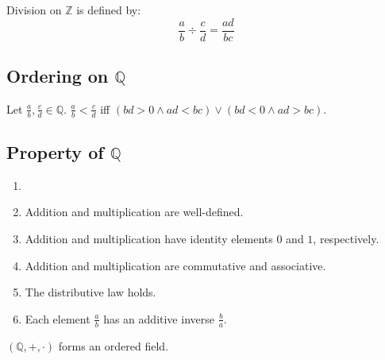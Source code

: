 \documentclass{report}
\begin{document}
			\begin{defn} \label{def_div_Q}
				Division on $\mathbb{Z}$ is defined by:
				\begin{displaymath}
					\frac{a}{b}\div\frac{c}{d}=\frac{ad}{bc}
				\end{displaymath}
			\end{defn}
		
		\subsection{Ordering on $\mathbb{Q}$}
		
			\begin{defn} \label{def_order_Q}
				Let $\frac{a}{b},\frac{c}{d} \in \mathbb{Q}$. $\frac{a}{b}<\frac{c}{d}$ iff $(bd>0 \wedge ad<bc) \vee (bd<0 \wedge ad>bc)$.
			\end{defn}
			
\begin{comment}%
			\begin{prop}
				The subset $P=\{\frac{a}{b}\in\mathbb{Q}|ab>0}$ is a positive set in $\mathbb{Q}$.
			\end{prop}
\end{comment}
		
		\subsection{Property of $\mathbb{Q}$}
		
			\begin{thm} \label{thm_property_Q}
				\begin{enumerate}
					\item[]
					\item Addition and multiplication are well-defined.
					\item Addition and multiplication have identity elements $0$ and $1$, respectively.
					\item Addition and multiplication are commutative and associative.
					\item The distributive law holds.
					\item Each element $\frac{a}{b}$ has an additive inverse $\frac{b}{a}$.
				\end{enumerate}
			\end{thm}
		
			\begin{thm}
				$(\mathbb{Q},+,\cdot)$ forms an ordered field.
			\end{thm}
		
\end{document}
